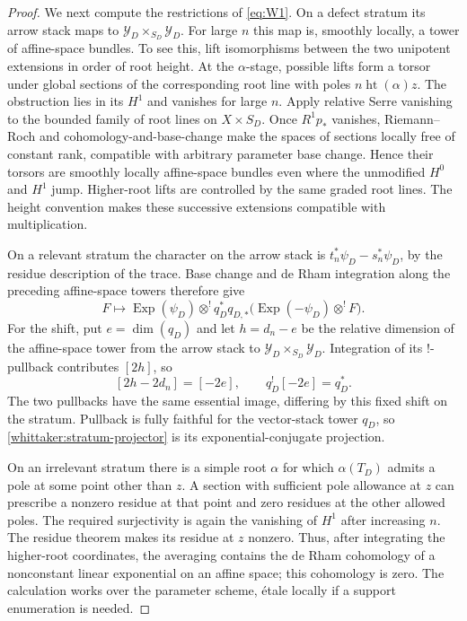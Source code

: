 \begin{proof}
We next compute the restrictions of \eqref{eq:W1}. On a defect stratum its
arrow stack maps to $\mathcal Y_D\times_{S_D}\mathcal Y_D$. For large $n$
this map is, smoothly locally, a tower of affine-space bundles. To see
this, lift isomorphisms between the two unipotent extensions in order of
root height. At the $\alpha$-stage, possible lifts form a torsor under
global sections of the corresponding root line with poles
$n\operatorname{ht}(\alpha)z$. The obstruction lies in its $H^1$ and
vanishes for large $n$. Apply relative Serre vanishing to the bounded
family of root lines on $X\times S_D$. Once $R^1p_*$ vanishes,
Riemann--Roch and cohomology-and-base-change make the spaces of sections
locally free of constant rank, compatible with arbitrary parameter base
change. Hence their torsors are smoothly locally affine-space bundles
even where the unmodified $H^0$ and $H^1$ jump. Higher-root lifts are
controlled by the same graded root lines. The height convention makes these successive extensions
compatible with multiplication.

On a relevant stratum the character on the arrow stack is
$t_n^*\psi_D-s_n^*\psi_D$, by the residue description of the trace.
Base change and de Rham integration along the preceding affine-space
towers therefore give
\begin{equation}\label{whittaker:stratum-projector}
 F\longmapsto\operatorname{Exp}(\psi_D)\otimes^!
 q_D^*q_{D,*}\bigl(\operatorname{Exp}(-\psi_D)\otimes^!F\bigr).
\end{equation}
For the shift, put $e=\dim(q_D)$ and let $h=d_n-e$ be the relative
dimension of the affine-space tower from the arrow stack to
$\mathcal Y_D\times_{S_D}\mathcal Y_D$. Integration of its $!$-pullback
contributes $[2h]$, so
\[
 [2h-2d_n]=[-2e],\qquad q_D^![-2e]=q_D^*.
\]
The two pullbacks have the same essential image, differing by this fixed
shift on the stratum. Pullback is fully faithful for the vector-stack tower
$q_D$, so \eqref{whittaker:stratum-projector} is its exponential-conjugate
projection.

On an irrelevant stratum there is a simple root $\alpha$ for which
$\alpha(T_D)$ admits a pole at some point other than $z$. A section with
sufficient pole allowance at $z$ can prescribe a nonzero residue at that
point and zero residues at the other allowed poles. The required
surjectivity is again the vanishing of $H^1$ after increasing $n$.
The residue theorem makes its residue at $z$ nonzero. Thus, after
integrating the higher-root coordinates, the averaging contains the de
Rham cohomology of a nonconstant linear exponential on an affine space;
this cohomology is zero. The calculation works over the parameter scheme,
\'etale locally if a support enumeration is needed.


\end{proof}
